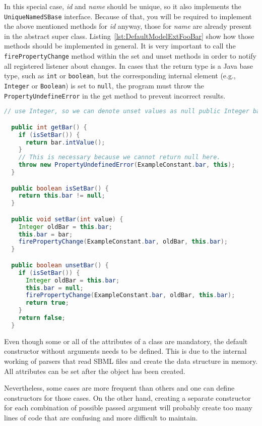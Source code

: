In this special case, \emph{id} and \emph{name} should be unique, so it also
implements the \texttt{UniqueNamedSBase} interface.
Because of that, you will be required to implement the above mentioned methods
for \emph{id} anyway, those for \emph{name} are already present in the abstract super class.
Listing~\vref{lst:DefaultModelExtFooBar} show how those methods should be
implemented in general. It is very important to call the
\texttt{firePropertyChange} method within the set and unset
methods in order to notify all registered listener about changes. In cases that
the return type is a Java base type, such as \texttt{int} or \texttt{boolean},
but the corresponding internal element (e.g., \texttt{Integer} or
\texttt{Boolean}) is set to \texttt{null}, the program must throw the
\texttt{PropertyUndefineError} in the get method to prevent incorrect results.

\begin{lstlisting}[language=Java,caption={Five necessary methods that should be
created for each \texttt{Foo} class attribute in detail},
label={lst:DefaultModelExtFooBar}]
  // use Integer, so we can denote unset values as null public Integer bar;

  public int getBar() {
    if (isSetBar()) {
      return bar.intValue();
    }
    // This is necessary because we cannot return null here.
    throw new PropertyUndefinedError(ExampleConstant.bar, this);
  }

  public boolean isSetBar() {
    return this.bar != null;
  }

  public void setBar(int value) {
    Integer oldBar = this.bar;
    this.bar = bar;
    firePropertyChange(ExampleConstant.bar, oldBar, this.bar);
  }

  public boolean unsetBar() {
    if (isSetBar()) {
      Integer oldBar = this.bar;
      this.bar = null;
      firePropertyChange(ExampleConstant.bar, oldBar, this.bar);
      return true;
    }
    return false;
  }
\end{lstlisting}

Even though some or all of the attributes of a class are mandatory, the default constructor without arguments needs to be defined.
This is due to the internal working of parsers that read SBML files and create the data structure in memory.
All attributes can be set after the object has been created.

Nevertheless, some cases are more frequent than others and one can define constructors for those cases.
On the other hand, creating a separate constructor for each combination of possible passed argument will probably create too many lines of code
that are confusing and more difficult to maintain.

